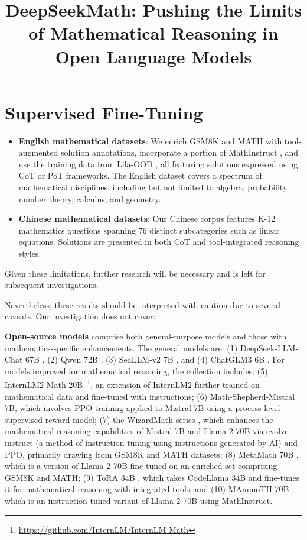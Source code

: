 \title{DeepSeekMath: Pushing the Limits of Mathematical Reasoning in Open Language Models}
\section{Supervised Fine-Tuning}

\begin{itemize}[topsep=0pt]
    \item \textbf{English mathematical datasets}: We enrich GSM8K and MATH with tool-augmented solution annotations, incorporate a portion of MathInstruct \citep{MathInstruct}, and use the training data from Lila-OOD \citep{lila}, all featuring solutions expressed using CoT or PoT frameworks. The English dataset covers a spectrum of mathematical disciplines, including but not limited to algebra, probability, number theory, calculus, and geometry.
    \item \textbf{Chinese mathematical datasets}: Our Chinese corpus features K-12 mathematics questions spanning 76 distinct subcategories such as linear equations. Solutions are presented in both CoT and tool-integrated reasoning styles.
\end{itemize}

Given these limitations, further research will be necessary and is left for subsequent investigations.

Nevertheless, these results should be interpreted with caution due to several caveats. Our investigation does not cover:

\item \textbf{Open-source models} comprise both general-purpose models and those with mathematics-specific enhancements. The general models are: (1) DeepSeek-LLM-Chat 67B \citep{deepseek-llm}, (2) Qwen 72B \citep{qwen}, (3) SeaLLM-v2 7B \citep{seallm}, and (4) ChatGLM3 6B \citep{chatglm3}. For models improved for mathematical reasoning, the collection includes: (5) InternLM2-Math 20B~\footnote{\url{https://github.com/InternLM/InternLM-Math}}, an extension of InternLM2 further trained on mathematical data and fine-tuned with instructions; (6) Math-Shepherd-Mistral 7B, which involves PPO training \citep{schulman2017proximal} applied to Mistral 7B \citep{mistral} using a process-level supervised reward model; (7) the WizardMath series \citep{wizardmath}, which enhances the mathematical reasoning capabilities of Mistral 7B and Llama-2 70B \citep{llama2} via evolve-instruct (a method of instruction tuning using instructions generated by AI) and PPO, primarily drawing from GSM8K and MATH datasets; (8) MetaMath 70B \citep{metamath}, which is a version of Llama-2 70B fine-tuned on an enriched set comprising GSM8K and MATH; (9) ToRA 34B \cite{tora}, which takes CodeLlama 34B and fine-tunes it for mathematical reasoning with integrated tools; and (10) MAmmoTH 70B \citep{MathInstruct}, which is an instruction-tuned variant of Llama-2 70B using MathInstruct.

